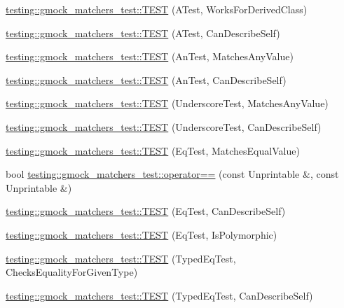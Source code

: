 \begin{DoxyCompactItemize}
\item 
\hyperlink{namespacetesting_1_1gmock__matchers__test_a2b2dfb85d18883b07f7d13d21abee2fc}{testing\+::gmock\+\_\+matchers\+\_\+test\+::\+T\+E\+ST} (A\+Test, Works\+For\+Derived\+Class)
\item 
\hyperlink{namespacetesting_1_1gmock__matchers__test_a24432bc861bee430fb8ac1a4e5463ecf}{testing\+::gmock\+\_\+matchers\+\_\+test\+::\+T\+E\+ST} (A\+Test, Can\+Describe\+Self)
\item 
\hyperlink{namespacetesting_1_1gmock__matchers__test_a15bf6771986d1e9f675f29861f7551c1}{testing\+::gmock\+\_\+matchers\+\_\+test\+::\+T\+E\+ST} (An\+Test, Matches\+Any\+Value)
\item 
\hyperlink{namespacetesting_1_1gmock__matchers__test_ac3b18688ca5b5cf2d6137ce3e7397691}{testing\+::gmock\+\_\+matchers\+\_\+test\+::\+T\+E\+ST} (An\+Test, Can\+Describe\+Self)
\item 
\hyperlink{namespacetesting_1_1gmock__matchers__test_a3fc77fa5ca709ef70963026fd7114552}{testing\+::gmock\+\_\+matchers\+\_\+test\+::\+T\+E\+ST} (Underscore\+Test, Matches\+Any\+Value)
\item 
\hyperlink{namespacetesting_1_1gmock__matchers__test_a25ae831c15c9ca918ed847ba147ac572}{testing\+::gmock\+\_\+matchers\+\_\+test\+::\+T\+E\+ST} (Underscore\+Test, Can\+Describe\+Self)
\item 
\hyperlink{namespacetesting_1_1gmock__matchers__test_a2ac5d4c2fae3e7f2e6c6be657a61f86a}{testing\+::gmock\+\_\+matchers\+\_\+test\+::\+T\+E\+ST} (Eq\+Test, Matches\+Equal\+Value)
\item 
bool \hyperlink{namespacetesting_1_1gmock__matchers__test_a4b9f261a3b98ba0e0bca21b69d593241}{testing\+::gmock\+\_\+matchers\+\_\+test\+::operator==} (const Unprintable \&, const Unprintable \&)
\item 
\hyperlink{namespacetesting_1_1gmock__matchers__test_a1c86e845cb44f34eeac4863041c871c6}{testing\+::gmock\+\_\+matchers\+\_\+test\+::\+T\+E\+ST} (Eq\+Test, Can\+Describe\+Self)
\item 
\hyperlink{namespacetesting_1_1gmock__matchers__test_ac3ea755ba2a8bb480cee70aa37ccafc2}{testing\+::gmock\+\_\+matchers\+\_\+test\+::\+T\+E\+ST} (Eq\+Test, Is\+Polymorphic)
\item 
\hyperlink{namespacetesting_1_1gmock__matchers__test_a3e8d6cc259c1410a85572bc773bb21b9}{testing\+::gmock\+\_\+matchers\+\_\+test\+::\+T\+E\+ST} (Typed\+Eq\+Test, Checks\+Equality\+For\+Given\+Type)
\item 
\hyperlink{namespacetesting_1_1gmock__matchers__test_a9baf261536023ac58ed65cdafcaf1602}{testing\+::gmock\+\_\+matchers\+\_\+test\+::\+T\+E\+ST} (Typed\+Eq\+Test, Can\+Describe\+Self)

\end{DoxyCompactItemize}
